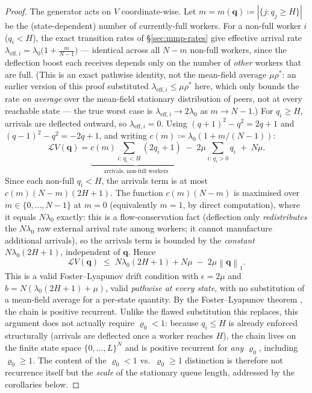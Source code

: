 \documentclass[11pt,a4paper]{article}
\newcommand{\norm}[1]{\left\lVert #1 \right\rVert}
\newcommand{\rhostar}{\rho^{*}}
\newcommand{\rhozero}{\varrho_0}
\newcommand{\generator}{\mathcal{L}}
\begin{document}
\begin{proof}
The generator acts on $V$ coordinate-wise. Let $m = m(\mathbf{q})
\coloneqq |\{j : q_j \geq H\}|$ be the (state-dependent) number of
currently-full workers. For a non-full worker $i$ ($q_i<H$), the exact
transition rates of \S\ref{sec:mmp-rates} give effective arrival rate
$\lambda_{\mathrm{eff},i} = \lambda_0\bigl(1 + \tfrac{m}{N-1}\bigr)$
--- identical across all $N-m$ non-full workers, since the deflection
boost each receives depends only on the number of \emph{other} workers
that are full. (This is an exact pathwise identity, not the mean-field
average $\mu\rhostar$: an earlier version of this proof substituted
$\lambda_{\mathrm{eff},i}\leq\mu\rhostar$ here, which only bounds the
rate \emph{on average} over the mean-field stationary distribution of
peers, not at every reachable state --- the true worst case is
$\lambda_{\mathrm{eff},i} \to 2\lambda_0$ as $m\to N-1$.) For $q_i \geq
H$, arrivals are deflected outward, so $\lambda_{\mathrm{eff},i} = 0$.
Using $(q+1)^2-q^2=2q+1$ and $(q-1)^2-q^2=-2q+1$, and writing
$c(m) \coloneqq \lambda_0(1+m/(N-1))$:
\[
  \generator V(\mathbf{q})
  = \underbrace{c(m)\!\!\sum_{i:\,q_i<H}\!\!(2q_i+1)}_{\text{arrivals, non-full workers}}
  \;-\; 2\mu\!\!\sum_{i:\,q_i>0}\!\!q_i \;+\; N\mu.
\]
Since each non-full $q_i < H$, the arrivals term is at most
$c(m)(N-m)(2H+1)$. The function $c(m)(N-m)$ is maximised over
$m\in\{0,\ldots,N-1\}$ at $m=0$ (equivalently $m=1$, by direct
computation), where it equals $N\lambda_0$ exactly: this is a flow-conservation
fact (deflection only \emph{redistributes} the $N\lambda_0$ raw external
arrival rate among workers; it cannot manufacture additional arrivals),
so the arrivals term is bounded by the \emph{constant}
$N\lambda_0(2H+1)$, independent of $\mathbf{q}$. Hence
\[
  \generator V(\mathbf{q})
  \;\leq\; N\lambda_0(2H+1) + N\mu \;-\; 2\mu\norm{\mathbf{q}}_1.
  \label{eq:perworker-drift}
\]
This is a valid Foster--Lyapunov drift condition with $\epsilon=2\mu$
and $b = N(\lambda_0(2H+1)+\mu)$, valid \emph{pathwise at every state},
with no substitution of a mean-field average for a per-state quantity.
By the Foster--Lyapunov theorem \cite{meyn2009}, the chain is positive
recurrent. Unlike the flawed substitution this replaces, this argument
does not actually require $\rhozero<1$: because $q_i\le H$ is already
enforced structurally (arrivals are deflected once a worker reaches
$H$), the chain lives on the finite state space $\{0,\ldots,L\}^N$ and
is positive recurrent for \emph{any} $\rhozero$, including
$\rhozero\geq 1$. The content of the $\rhozero<1$ vs.\ $\rhozero\geq 1$
distinction is therefore not recurrence itself but the \emph{scale} of
the stationary queue length, addressed by the corollaries below.
\end{proof}
\end{document}
